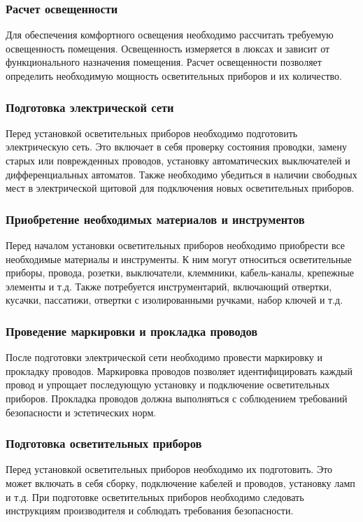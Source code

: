 \documentclass{article}
\begin{document}
\subsubsection{Расчет освещенности}
Для обеспечения комфортного освещения необходимо рассчитать требуемую освещенность помещения. Освещенность измеряется в люксах и зависит от функционального назначения помещения. Расчет освещенности позволяет определить необходимую мощность осветительных приборов и их количество.
\subsubsection{Подготовка электрической сети}
Перед установкой осветительных приборов необходимо подготовить электрическую сеть. Это включает в себя проверку состояния проводки, замену старых или поврежденных проводов, установку автоматических выключателей и дифференциальных автоматов. Также необходимо убедиться в наличии свободных мест в электрической щитовой для подключения новых осветительных приборов.
\subsubsection{Приобретение необходимых материалов и инструментов}
Перед началом установки осветительных приборов необходимо приобрести все необходимые материалы и инструменты. К ним могут относиться осветительные приборы, провода, розетки, выключатели, клеммники, кабель-каналы, крепежные элементы и т.д. Также потребуется инструментарий, включающий отвертки, кусачки, пассатижи, отвертки с изолированными ручками, набор ключей и т.д.
\subsubsection{Проведение маркировки и прокладка проводов}
После подготовки электрической сети необходимо провести маркировку и прокладку проводов. Маркировка проводов позволяет идентифицировать каждый провод и упрощает последующую установку и подключение осветительных приборов. Прокладка проводов должна выполняться с соблюдением требований безопасности и эстетических норм.
\subsubsection{Подготовка осветительных приборов}
Перед установкой осветительных приборов необходимо их подготовить. Это может включать в себя сборку, подключение кабелей и проводов, установку ламп и т.д. При подготовке осветительных приборов необходимо следовать инструкциям производителя и соблюдать требования безопасности.
\end{document}
